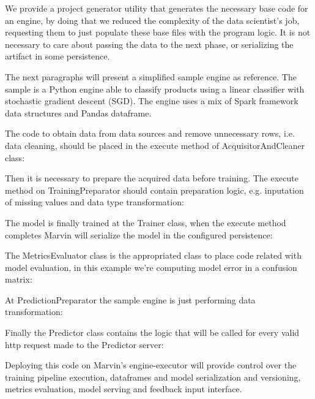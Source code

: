 \documentclass[twoside,11pt]{article}
\begin{document}
We provide a project generator utility that generates the necessary base code for an engine, by doing that we reduced the complexity of the data scientist's job, requesting them to just populate these base files with the program logic. It is not necessary to care about passing the data to the next phase, or serializing the artifact in some persistence. 

The next paragraphs will present a simplified sample engine as reference. The sample is a Python engine able to classify products using a linear classifier with stochastic gradient descent (SGD). The engine uses a mix of Spark framework data structures and Pandas dataframe.

The code to obtain data from data sources and remove unnecessary rows, i.e. data cleaning, should be placed in the execute method of AcquisitorAndCleaner class:


Then it is necessary to prepare the acquired data before training. The execute method on TrainingPreparator should contain preparation logic, e.g. inputation of missing values and data type transformation:
\newpage


The model is finally trained at the Trainer class, when the execute method completes Marvin will serialize the model in the configured persistence:



The MetricsEvaluator class is the appropriated class to place code related with model evaluation, in this example we're computing model error in a confusion matrix:



At PredictionPreparator the sample engine is just performing data transformation:


Finally the Predictor class contains the logic that will be called for every valid http request made to the Predictor server:


Deploying this code on Marvin's engine-executor will provide control over the training pipeline execution, dataframes and model serialization and versioning, metrics evaluation, model serving and feedback input interface.
\end{document}
